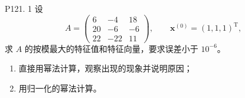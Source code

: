 \documentclass[11pt, a4paper]{ctexart}
\begin{document}
\begin{problem}{P121. 1}
    设
    \[
        A =
        \begin{pmatrix}
            6 & -4 & 18 \\
            20 & -6 & -6 \\
            22 & -22 & 11
        \end{pmatrix},
        \qquad
        \boldsymbol{x}^{(0)}=(1,1,1)^{\mathrm{T}},
    \]
    求 $A$ 的按模最大的特征值和特征向量，要求误差小于 $10^{-6}$。
    \begin{enumerate}[1.]
        \item 直接用幂法计算，观察出现的现象并说明原因；
        \item 用归一化的幂法计算。
    \end{enumerate}
\end{problem}
\end{document}

